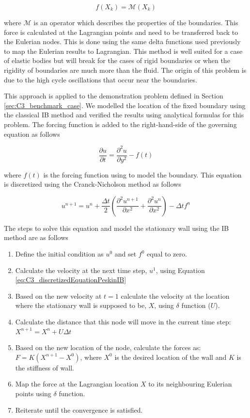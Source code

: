 \begin{equation}
	f(X_k) = \mathcal{M}(X_k)
\end{equation}

where $\mathcal{M}$ is an operator which describes the properties of the boundaries. This force is calculated at the Lagrangian points and need to be transferred back to the Eulerian nodes. This is done using the same delta functions used previously to map the Eulerian results to Lagrangian. This method is well suited for a case of elastic bodies but will break for the cases of rigid boundaries or when the rigidity of boundaries are much more than the fluid. The origin of this problem is due to the high cycle oscillations that occur near the boundaries.

This approach is applied to the demonstration problem defined in Section \ref{sec:C3_benchmark_case}. We modelled the location of the fixed boundary using the classical IB method and verified the results using analytical formulas for this problem. The forcing function is added to the right-hand-side of the governing equation as follows

\begin{equation}
	\frac{\partial u}{\partial t} = \frac{\partial^2 u}{\partial y^2} - f(t)
\end{equation}

where $f(t)$ is the forcing function using to model the boundary. This equation is discretized using the Cranck-Nicholson method as follows

\begin{equation}\label{eq:C3_discretizedEquationPeskinIB}
	u^{n+1} = u^{n} + \frac{\Delta t}{2} \left( \frac{\partial^2 u^{n+1}}{\partial x^2} + 
	                                            \frac{\partial^2 u^n}{\partial x^2}\right) - \Delta t f^n 
\end{equation}

The steps to solve this equation and model the stationary wall using the IB method are as follows

\begin{enumerate}
	\item Define the initial condition as $u^0$ and set $f^0$ equal to zero.
	\item Calculate the velocity at the next time step, $u^1$, using Equation \eqref{eq:C3_discretizedEquationPeskinIB}
	\item Based on the new velocity at $t=1$ calculate the velocity at the location where the stationary wall is supposed to be, $X$, using $\delta$ function ($U$).
	\item Calculate the distance that this node will move in the current time step: $X^{n+1} = X^n + U \Delta t$
	\item Based on the new location of the node, calculate the forces as: $F = K \left( X^{n+1} - X^0 \right)$, where $X^0$ is the desired location of the wall and $K$ is the stiffness of wall. 
	\item Map the force at the Lagrangian location $X$ to its neighbouring Eulerian points using $\delta$ function.
	\item Reiterate until the convergence is satisfied.
\end{enumerate}

